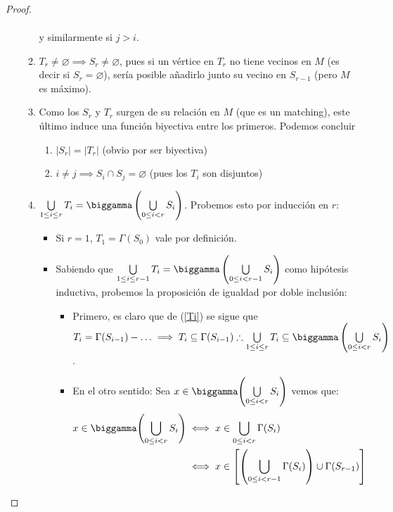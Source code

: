 \begin{proof}
\begin{enumerate}
\begin{enumerate}
\begin{align}
        \end{align}\label{Ti}
        y similarmente si $j > i$.
        \item $T_r \neq \varnothing \implies S_r \neq \varnothing$, pues si un vértice en $T_r$ no tiene vecinos en $M$ (es decir si $S_r = \varnothing$), sería posible añadirlo junto su vecino en $S_{r-1}$ (pero $M$ es máximo).
        \item Como los $S_r$ y $T_r$ surgen de su relación en $M$ (que es un matching), este último induce una función biyectiva entre los primeros. Podemos concluir
        \begin{enumerate}
            \item $\left| S_r \right| = \left| T_r \right|$ (obvio por ser biyectiva)
            \item $i \neq j \implies S_i \cap S_j = \varnothing$ (pues los $T_i$ son disjuntos)
        \end{enumerate}
        \item $\bigcup \limits_{1 \le i \le r} T_i = \biggamma \left( \bigcup \limits_{0 \le i < r} S_i \right)$. Probemos esto por inducción en $r$:
        \begin{itemize}
            \item Si $r=1$, $T_1 = \Gamma(S_0)$ vale por definición.
            \item Sabiendo que $\bigcup \limits_{1 \le i \le r-1} T_i = \biggamma \left( \bigcup \limits_{0 \le i < r-1} S_i \right)$ como hipótesis inductiva, probemos la proposición de igualdad por doble inclusión:
            \begin{itemize}
                \item Primero, es claro que de (\ref{Ti}) se sigue que $T_i = \Gamma(S_{i-1}) - \mathellipsis \implies T_i \subseteq \Gamma(S_{i-1}) \\ \therefore \bigcup \limits_{1 \le i \le r} T_i \subseteq \biggamma \left( \bigcup \limits_{0 \le i < r} S_i \right)$.
                \item En el otro sentido: Sea $x \in \biggamma \Biggl( \bigcup \limits_{0 \le i < r} S_i \Biggr)$ vemos que:
            \begin{align}
                x \in \biggamma \Biggl( \bigcup \limits_{0 \le i < r} S_i \Biggr) &\iff 
                x \in  \bigcup \limits_{0 \le i < r} \Gamma(S_i) \\
                &\iff
                x \in \left[\left(\bigcup \limits_{0 \le i < r-1} \Gamma (S_i) \right) \cup \Gamma(S_{r-1}) \right] \\

\end{align}
\end{itemize}
\end{itemize}
\end{enumerate}
\end{enumerate}
\end{proof}
